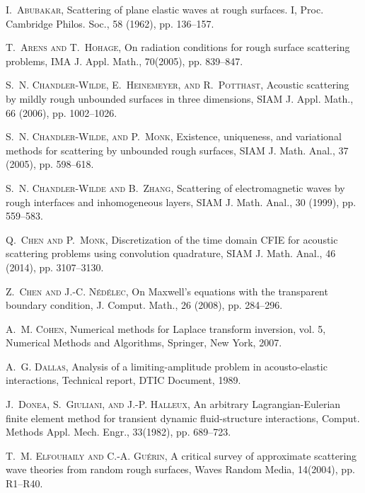\documentclass[final,leqno]{siamltex}
\begin{document}
\begin{thebibliography}{10}

\textsc{I.~Abubakar}, Scattering of plane elastic waves at rough surfaces. I,
Proc. Cambridge Philos. Soc., 58 (1962), pp. 136--157.

\textsc{T.~Arens and T.~Hohage}, On radiation conditions for rough surface
scattering problems, IMA J. Appl. Math., 70(2005), pp. 839--847.

\textsc{S.~N. Chandler-Wilde, E.~Heinemeyer, and R.~Potthast}, Acoustic
scattering by mildly rough unbounded surfaces in three dimensions, SIAM J. Appl.
Math., 66 (2006), pp. 1002--1026.

\textsc{S.~N. Chandler-Wilde, and P.~Monk}, Existence, uniqueness, and
variational methods for scattering by unbounded rough surfaces, SIAM J. Math.
Anal., 37 (2005), pp. 598--618.

\textsc{S.~N. Chandler-Wilde and B.~Zhang}, Scattering of electromagnetic waves
by rough interfaces and inhomogeneous layers, SIAM J. Math. Anal., 30 (1999),
pp. 559--583.

\textsc{Q.~Chen and P.~Monk}, Discretization of the time domain CFIE for
acoustic scattering problems using convolution quadrature, SIAM J. Math. Anal.,
46 (2014), pp. 3107--3130.

\textsc{Z.~Chen and J.-C. N{\'e}d{\'e}lec}, On Maxwell's equations with the
transparent boundary condition, J. Comput. Math., 26 (2008), pp. 284--296.

\textsc{A.~M. Cohen}, Numerical methods for Laplace transform inversion,
vol. 5, Numerical Methods and Algorithms, Springer, New York, 2007.

\textsc{A.~G. Dallas}, Analysis of a limiting-amplitude problem in
acousto-elastic interactions, Technical report, DTIC Document, 1989.

\textsc{J.~Donea, S.~Giuliani, and J.-P. Halleux}, An arbitrary
Lagrangian-Eulerian finite element method for transient dynamic fluid-structure
interactions, Comput. Methods Appl. Mech. Engr., 33(1982),
pp. 689--723.

\textsc{T.~M. Elfouhaily and C.-A. Gu{\'e}rin}, A critical survey of approximate
scattering wave theories from random rough surfaces, Waves Random
Media, 14(2004), pp. R1--R40.


\end{thebibliography}
\end{document}
